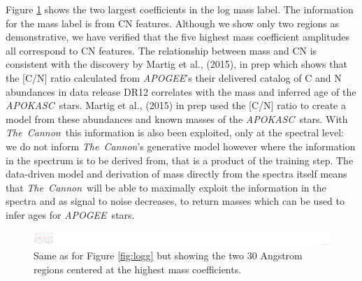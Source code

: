 \documentclass[12pt, preprint]{aastex}
\newcommand{\project}[1]{\textsl{#1}}
\newcommand{\tc}{\project{The~Cannon}}
\newcommand{\apogee}{\project{APOGEE}}
\newcommand{\apokasc}{\project{APOKASC}}
\begin{document}
Figure \ref{fig:mass} shows the two largest coefficients in the log mass label. The information for the mass label is from CN features. Although we show only two regions as demonstrative, we have verified that the five highest mass coefficient amplitudes all correspond to CN features. The relationship between mass and CN is consistent with the discovery by Martig et al., (2015), in prep which shows that the [C/N] ratio calculated from \apogee's their delivered catalog of C and N abundances in data release DR12 correlates with the mass and inferred age of the \apokasc\ stars. Martig et al., (2015) in prep used the [C/N] ratio to create a model from these abundances and known masses of the \apokasc\ stars. With \tc\, this information is also been exploited, only at the spectral level: we do not inform \tc's generative model however where the information in the spectrum is to be derived from, that is a product of the training step. The data-driven model and derivation of mass directly from the spectra itself means that \tc\ will be able to maximally exploit the information in the spectra and as signal to noise decreases, to return masses which can be used to infer ages for \apogee\ stars.  

\begin{figure}[h!]
\centering
    \includegraphics[scale=0.51]{./plots/coeffs_m_3.png}
  \caption{Same as for Figure \ref{fig:logg} but showing the two 30 Angstrom regions centered at the highest mass coefficients.}
\label{fig:mass}
\end{figure}
\end{document}
